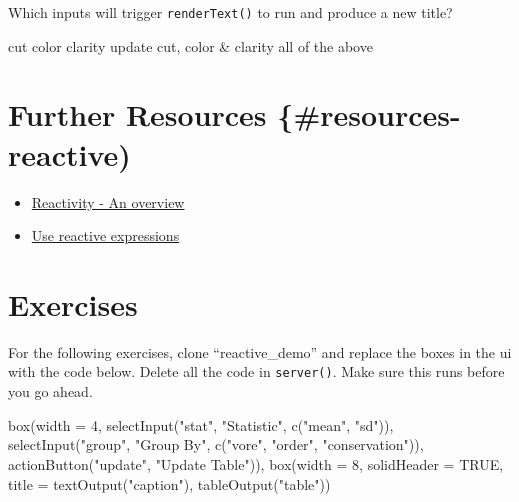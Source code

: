 \documentclass[
]{book}
\newenvironment{Shaded}{\begin{snugshade}}{\end{snugshade}}
\newcommand{\AttributeTok}[1]{\textcolor[rgb]{0.77,0.63,0.00}{#1}}
\newcommand{\ConstantTok}[1]{\textcolor[rgb]{0.00,0.00,0.00}{#1}}
\newcommand{\DecValTok}[1]{\textcolor[rgb]{0.00,0.00,0.81}{#1}}
\newcommand{\FunctionTok}[1]{\textcolor[rgb]{0.00,0.00,0.00}{#1}}
\newcommand{\NormalTok}[1]{#1}
\newcommand{\StringTok}[1]{\textcolor[rgb]{0.31,0.60,0.02}{#1}}
\providecommand{\tightlist}{%
  \setlength{\itemsep}{0pt}\setlength{\parskip}{0pt}}
\begin{document}
Which inputs will trigger \texttt{renderText()} to run and produce a new title?

cut color clarity update cut, color \& clarity all of the above

\hypertarget{further-resources-resources-reactive}{%
\section{Further Resources \{\#resources-reactive)}\label{further-resources-resources-reactive}}

\begin{itemize}
\tightlist
\item
  \href{https://shiny.rstudio.com/articles/reactivity-overview.html}{Reactivity - An overview}
\item
  \href{https://shiny.rstudio.com/tutorial/written-tutorial/lesson6/}{Use reactive expressions}
\end{itemize}

\hypertarget{exercises-reactive}{%
\section{Exercises}\label{exercises-reactive}}

For the following exercises, clone ``reactive\_demo'' and replace the boxes in the ui with the code below. Delete all the code in \texttt{server()}. Make sure this runs before you go ahead.

\begin{Shaded}
\begin{Highlighting}[]
\FunctionTok{box}\NormalTok{(}\AttributeTok{width =} \DecValTok{4}\NormalTok{,}
    \FunctionTok{selectInput}\NormalTok{(}\StringTok{"stat"}\NormalTok{, }\StringTok{"Statistic"}\NormalTok{, }\FunctionTok{c}\NormalTok{(}\StringTok{"mean"}\NormalTok{, }\StringTok{"sd"}\NormalTok{)),}
    \FunctionTok{selectInput}\NormalTok{(}\StringTok{"group"}\NormalTok{, }\StringTok{"Group By"}\NormalTok{, }\FunctionTok{c}\NormalTok{(}\StringTok{"vore"}\NormalTok{, }\StringTok{"order"}\NormalTok{, }\StringTok{"conservation"}\NormalTok{)),}
    \FunctionTok{actionButton}\NormalTok{(}\StringTok{"update"}\NormalTok{, }\StringTok{"Update Table"}\NormalTok{)),}
\FunctionTok{box}\NormalTok{(}\AttributeTok{width =} \DecValTok{8}\NormalTok{,}
    \AttributeTok{solidHeader =} \ConstantTok{TRUE}\NormalTok{,}
    \AttributeTok{title =} \FunctionTok{textOutput}\NormalTok{(}\StringTok{"caption"}\NormalTok{),}
    \FunctionTok{tableOutput}\NormalTok{(}\StringTok{"table"}\NormalTok{))}
\end{Highlighting}
\end{Shaded}
\end{document}
